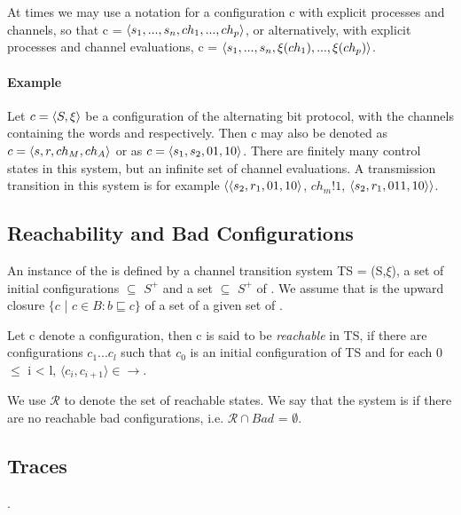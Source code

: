 At times we may use a notation for a configuration c with explicit processes and channels, so that c = $\langle s_1,...,s_n, ch_1,...,ch_p\rangle$, or alternatively, with explicit processes and channel evaluations, c = $\langle s_1,...,s_n, \xi(ch_1),...,\xi(ch_p)\rangle$.

\paragraph{Example}
Let $c = \langle S,\xi\rangle$ be a configuration of the alternating bit protocol, with the channels containing the words  and  respectively. Then c may also be denoted as $c = \langle s,r,ch_M,ch_A\rangle$ or as $c = \langle s_1,s_2,01,10\rangle$. There are finitely many control states in this system, but an infinite set of channel evaluations. A transmission transition in this system is for example $\langle\langle s_2,r_1,01,10\rangle$, $ch_m!1$, $\langle s_2,r_1,011,10\rangle\rangle$. 

\subsection{Reachability and Bad Configurations}
An instance of the  is defined by a channel transition system TS = (S,$\xi$), a set of initial configurations  $\subseteq$ $S^+$ and a set  $\subseteq$ $S^+$ of . We assume that  is the upward closure $\{c$ | $ c \in B: b \sqsubseteq c\}$ of a set of a given  set of . 

Let c denote a configuration, then c is said to be \emph{reachable} in TS, if there are configurations $c_1...c_l$ such that $c_0$ is an initial configuration of TS and for each 0 $\leq$ i < l, $\langle c_i, c_{i+1} \rangle \in \rightarrow$.

We use $\mathcal{R}$ to denote the set of reachable states. We say that the system  is  if there are no reachable bad configurations, i.e. $\mathcal{R} \cap Bad$ = $\emptyset$.

\subsection{Traces}
.
